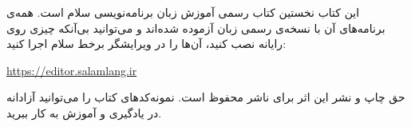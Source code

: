 \documentclass[11pt,openany]{book}
\makeatletter
\newcounter{program}[chapter]
\newcommand{\beginappendices}{\clearpage
  \setcounter{chapter}{0}\setcounter{section}{0}%
  \gdef\@chapapp{\appendixname}%
  \renewcommand{\thechapter}{\Alph{chapter}}%
  \renewcommand{\theHchapter}{app.\arabic{chapter}}%
  \renewcommand{\theHsection}{app.\arabic{chapter}.\arabic{section}}}
\makeatother
\begin{document}
\vspace{0.8cm}
\noindent{}

\vspace{1.5cm}
\noindent\small
این کتاب نخستین کتاب رسمی آموزش زبان برنامه‌نویسی سلام است. همه‌ی برنامه‌های
آن با نسخه‌ی رسمی زبان آزموده شده‌اند و می‌توانید بی‌آنکه چیزی روی رایانه
نصب کنید، آن‌ها را در ویرایشگر برخط سلام اجرا کنید:
\begin{center}
\url{https://editor.salamlang.ir}
\end{center}
\noindent حق چاپ و نشر این اثر برای ناشر محفوظ است. نمونه‌کدهای کتاب را
می‌توانید آزادانه در یادگیری و آموزش به کار ببرید.
\normalsize
\clearpage



\tableofcontents
\clearpage

\mainmatter











\beginappendices




\end{document}
